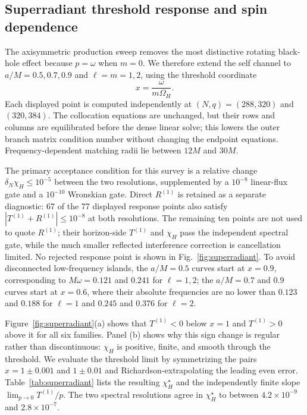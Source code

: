 \documentclass[aps,prd,twocolumn,10pt,nofootinbib,superscriptaddress,floatfix]{revtex4-2}
\begin{document}
\subsection{Superradiant threshold response and spin dependence}

The axisymmetric production sweep removes the most distinctive rotating
black-hole effect because $p=\omega$ when $m=0$.  We therefore extend the self
channel to $a/M=0.5,0.7,0.9$ and $\ell=m=1,2$, using the threshold coordinate
\begin{equation}
x=\frac{\omega}{m\Omega_H}.
\end{equation}
Each displayed point is computed independently at $(N,q)=(288,320)$ and
$(320,384)$.  The collocation equations are unchanged, but their rows and
columns are equilibrated before the dense linear solve; this lowers the outer
branch matrix condition number without changing the endpoint equations.
Frequency-dependent matching radii lie between $12M$ and $30M$.

The primary acceptance condition for this survey is a relative change
$\delta_N\chi_H\leq10^{-5}$ between the two resolutions, supplemented by a
$10^{-8}$ linear-flux gate and a $10^{-10}$ Wronskian gate.  Direct
$R^{(1)}$ is retained as a separate diagnostic: 67 of the 77 displayed
response points also satisfy $|T^{(1)}+R^{(1)}|\leq10^{-8}$ at both
resolutions.  The remaining ten points are not used to quote $R^{(1)}$; their
horizon-side $T^{(1)}$ and $\chi_H$ pass the independent spectral gate, while
the much smaller reflected interference correction is cancellation limited.
No rejected response point is shown in Fig.~\ref{fig:superradiant}.  To avoid
disconnected low-frequency islands, the $a/M=0.5$ curves start at $x=0.9$,
corresponding to $M\omega=0.121$ and $0.241$ for $\ell=1,2$; the $a/M=0.7$
and $0.9$ curves start at $x=0.6$, where their absolute frequencies are no
lower than $0.123$ and $0.188$ for $\ell=1$ and $0.245$ and $0.376$ for
$\ell=2$.

Figure~\ref{fig:superradiant}(a) shows that $T^{(1)}<0$ below $x=1$ and
$T^{(1)}>0$ above it for all six families.  Panel (b) shows why this sign
change is regular rather than discontinuous: $\chi_H$ is positive, finite,
and smooth through the threshold.  We evaluate the threshold limit by
symmetrizing the pairs $x=1\pm0.001$ and $1\pm0.01$ and Richardson-extrapolating
the leading even error.  Table~\ref{tab:superradiant} lists the resulting
$\chi_H^\star$ and the independently finite slope
$\lim_{p\to0}T^{(1)}/p$.  The two spectral resolutions agree in
$\chi_H^\star$ to between $4.2\times10^{-9}$ and $2.8\times10^{-7}$.
\end{document}
